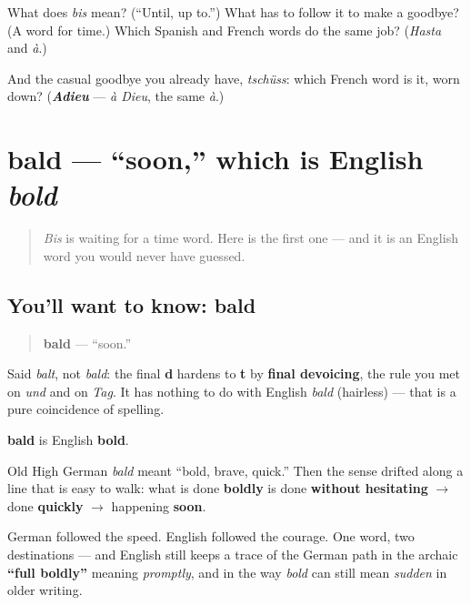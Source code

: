 \begin{tcolorbox}[breakable,colback=teal!4,colframe=teal!35!black,title={Before you move on}]
What does \emph{bis} mean? (\textquotedblleft{}Until, up to.\textquotedblright{}) What has to follow it to make a goodbye? (A word for time.) Which Spanish and French words do the same job? (\emph{Hasta} and \emph{à}.)

And the casual goodbye you already have, \emph{tschüss}: which French word is it, worn down? (\emph{\textbf{Adieu}} — \emph{à Dieu}, the same \emph{à}.)
\end{tcolorbox}
\section[bald]{bald — \textquotedblleft{}soon,\textquotedblright{} which is English \emph{bold}}

\label{lesson:GE-C04-bald}



\begin{quote}
\emph{Bis} is waiting for a time word. Here is the first one — and it is an English word you would never have guessed.
\end{quote}

\subsection*{You'll want to know: bald}
\begin{quote}
\textbf{bald} — \textquotedblleft{}soon.\textquotedblright{}
\end{quote}

Said \emph{balt}, not \emph{bald}: the final \textbf{d} hardens to \textbf{t} by \textbf{final devoicing}, the rule you met on \emph{und} and on \emph{Tag}. It has nothing to do with English \emph{bald} (hairless) — that is a pure coincidence of spelling.

\begin{cousinweb}
\textbf{bald} is English \textbf{bold}.

Old High German \emph{bald} meant \textquotedblleft{}bold, brave, quick.\textquotedblright{} Then the sense drifted along a line that is easy to walk: what is done \textbf{boldly} is done \textbf{without hesitating} $\to$ done \textbf{quickly} $\to$ happening \textbf{soon}.

German followed the speed. English followed the courage. One word, two destinations — and English still keeps a trace of the German path in the archaic \textbf{\textquotedblleft{}full boldly\textquotedblright{}} meaning \emph{promptly}, and in the way \emph{bold} can still mean \emph{sudden} in older writing.
\end{cousinweb}

